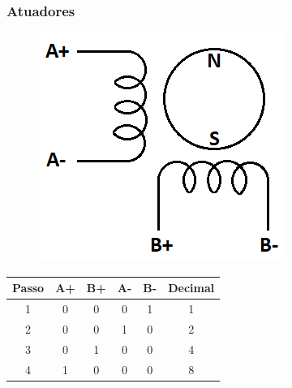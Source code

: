 \begin{frame}
\frametitle{Atuadores}
\centering

\begin{figure}
\centering
\includegraphics[scale = 0.5]{figs/meumotorbipolar}
\end{figure}
    
\begin{tabular}{cccccc}
    \hline
    \textbf{Passo} & \textbf{A+} & \textbf{B+} & \textbf{A-} & \textbf{B-} & \textbf{Decimal}\\
    \hline
    1 & 0 & 0 & 0 & 1 & 1\\
    2 & 0 & 0 & 1 & 0 & 2\\
    3 & 0 & 1 & 0 & 0 & 4\\
    4 & 1 & 0 & 0 & 0 & 8\\        
    \hline       
\end{tabular}
\end{frame}
